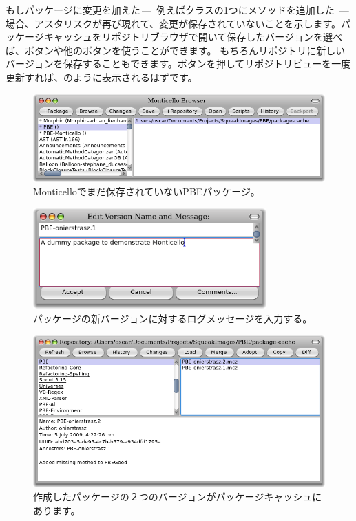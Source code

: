 \documentclass[a4paper,10pt,twoside]{book}
\begin{document}
もしパッケージに変更を加えた\,---\, 例えばクラスの1つにメソッドを追加した \,---\, 場合、アスタリスクが再び現れて、変更が保存されていないことを示します。パッケージキャッシュをリポジトリブラウザで開いて保存したバージョンを選べば、ボタンや他のボタンを使うことができます。
もちろんリポジトリに新しいバージョンを保存することもできます。ボタンを押してリポジトリビューを一度更新すれば、のように表示されるはずです。

\begin{figure}[tbp]
\begin{center}
\includegraphics[width=\textwidth]{MC+PBE}
\end{center}
\caption{Monticelloでまだ保存されていないPBEパッケージ。}
\end{figure}

\begin{figure}[tbp]
\begin{center}
\includegraphics[width=0.8\textwidth]{PBE-on}
\end{center}
\caption{パッケージの新バージョンに対するログメッセージを入力する。}
\end{figure}

\begin{figure}[tbp]
\begin{center}
\includegraphics[width=\textwidth]{package-cache-browser}
\end{center}
\caption{作成したパッケージの２つのバージョンがパッケージキャッシュにあります。}
\end{figure}
\end{document}
